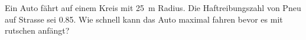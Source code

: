
\begin{aufgabe}
	Ein Auto fährt auf einem Kreis mit \SI{25}{m} Radius. Die Haftreibungszahl von Pneu auf Strasse sei \num{0.85}.
	Wie schnell kann das Auto maximal fahren bevor es mit rutschen anfängt?
\end{aufgabe}
\begin{loesung}

\end{loesung}
